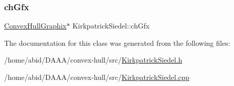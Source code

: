 \subsubsection{\texorpdfstring{chGfx}{chGfx}}
{\footnotesize\ttfamily \mbox{\hyperlink{class_convex_hull_graphix}{Convex\+Hull\+Graphix}}$\ast$ Kirkpatrick\+Siedel\+::ch\+Gfx}



The documentation for this class was generated from the following files\+:\begin{DoxyCompactItemize}
\item 
/home/abid/\+D\+A\+A\+A/convex-\/hull/src/\mbox{\hyperlink{_kirkpatrick_siedel_8h}{Kirkpatrick\+Siedel.\+h}}\item 
/home/abid/\+D\+A\+A\+A/convex-\/hull/src/\mbox{\hyperlink{_kirkpatrick_siedel_8cpp}{Kirkpatrick\+Siedel.\+cpp}}\end{DoxyCompactItemize}
